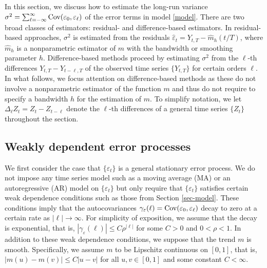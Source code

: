 In this section, we discuss how to estimate the long-run variance $\sigma^2 = \sum\nolimits_{\ell=-\infty}^{\infty} \textnormal{Cov}(\varepsilon_0,\varepsilon_{\ell})$ of the error terms in model \eqref{model}. There are two broad classes of estimators: residual- and difference-based estimators. In residual-based approaches, $\sigma^2$ is estimated from the residuals $\widehat{\varepsilon}_t = Y_{t,T} - \widehat{m}_h(t/T)$, where $\widehat{m}_h$ is a nonparametric estimator of $m$ with the bandwidth or smoothing parameter $h$. Difference-based methods proceed by estimating $\sigma^2$ from the $\ell$-th differences $Y_{t,T} - Y_{t-\ell,T}$ of the observed time series $\{Y_{t,T}\}$ for certain orders $\ell$. In what follows, we focus attention on difference-based methods as these do not involve a nonparametric estimator of the function $m$ and thus do not require to specify a bandwidth $h$ for the estimation of $m$. To simplify notation, we let $\Delta_\ell Z_t = Z_t - Z_{t-\ell}$ denote the $\ell$-th differences of a general time series $\{Z_t\}$ throughout the section. 


\subsection{Weakly dependent error processes}


We first consider the case that $\{ \varepsilon_t \}$ is a general stationary error process. We do not impose any time series model such as a moving average (MA) or an autoregressive (AR) model on $\{\varepsilon_t\}$ but only require that $\{\varepsilon_t\}$ satisfies certain weak dependence conditions such as those from Section \ref{sec-model}. These conditions imply that the autocovariances $\gamma_\varepsilon(\ell) = \textnormal{Cov}(\varepsilon_0,\varepsilon_{\ell})$ decay to zero at a certain rate as $|\ell| \rightarrow \infty$. For simplicity of exposition, we assume that the decay is exponential, that is, $|\gamma_\varepsilon(\ell)| \le C \rho^{|\ell|}$ for some $C > 0$ and $0 < \rho < 1$. In addition to these weak dependence conditions, we suppose that the trend $m$ is smooth. Specifically, we assume $m$ to be Lipschitz continuous on $[0,1]$, that is, $|m(u) - m(v)| \le C|u-v|$ for all $u,v \in [0,1]$ and some constant $C < \infty$. 


